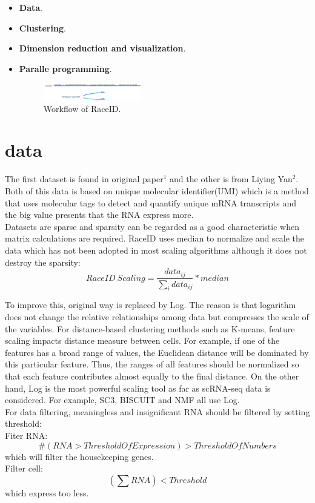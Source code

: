 \documentclass[10pt,journal]{IEEEtran}
\begin{document}
\begin{itemize}
  \item \textbf{Data}.
  \item \textbf{Clustering}.
  \item \textbf{Dimension reduction and visualization}.
  \item \textbf{Paralle programming}.
  
  \begin{figure}[H] 
\centering
\includegraphics[width=0.4\textwidth]{fig2/workflow.png} 
\caption{Workflow of RaceID.} 
\label{Fig.1}
\end{figure}
\end{itemize}





\section{data}
The first dataset is found in original paper\(^1\) and the other is from Liying Yan\(^2\). Both of this data is based on unique molecular identifier(UMI) which is a method that uses molecular tags to detect and quantify unique mRNA transcripts and the big value presents that the RNA express more.\\
\hspace*{0.2 cm}Datasets are sparse and sparsity can be regarded as a good characteristic when matrix calculations are required. RaceID uses median to normalize and scale the data which has not been adopted in most scaling algorithms although it does not destroy the sparsity:\[RaceID \ Scaling=\frac{data_{ij}}{\sum_i data_{ij}}*median\]

To improve this, original way is replaced by Log. The reason is that logarithm does not change the relative relationships among data but compresses the scale of the variables. For distance-based clustering methods such as K-means, feature scaling impacts distance measure between cells. For example, if one of the features has a broad range of values, the Euclidean distance will be dominated by this particular feature. Thus, the ranges of all features should be normalized so that each feature contributes almost equally to the final distance. On the other hand, Log is the most powerful scaling tool as far as scRNA-seq data is considered. For example, SC3, BISCUIT and NMF all use Log.\\
\hspace*{0.2 cm}For data filtering, meaningless and insignificant RNA should be filtered by setting threshold: \\
Fiter RNA:
 \[\# (RNA>ThresholdOfExpression) > ThresholdOfNumbers \] 
 which will filter the housekeeping genes.\\
 Filter cell:\\
 \[(\sum RNA )< Threshold\]
 which express too less.
\end{document}
